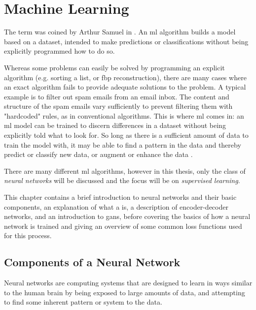 \chapter{Machine Learning}
\label{sec:ml}
The term  was coined by Arthur Samuel in \citeyear{samuelmachinelearning} \cite{samuelmachinelearning}. An \gls{ml} algorithm builds a model based on a dataset, intended to make predictions or classifications without being explicitly programmed how to do so. 

Whereas some problems can easily be solved by programming an explicit algorithm (e.g. sorting a list, or \gls{fbp} reconstruction), there are many cases where an exact algorithm fails to provide adequate solutions to the problem. A typical example is to filter out spam emails from an email inbox. The content and structure of the spam emails vary sufficiently to prevent filtering them with "hardcoded" rules, as in conventional algorithms. This is where \gls{ml} comes in: an \gls{ml} model can be trained to discern differences in a dataset without being explicitly told what to look for. So long as there is a sufficient amount of data to train the model with, it may be able to find a pattern in the data and thereby predict or classify new data, or augment or enhance the data \cite[2-4]{Alpaydin10}. 

There are many different \gls{ml} algorithms, however in this thesis, only the class of \textit{neural networks} will be discussed and the focus will be on \textit{supervised learning}. 

This chapter contains a brief introduction to neural networks and their basic components, an explanation of what a  is, a description of encoder-decoder networks, and an introduction to \glspl{gan}, before covering the basics of how a neural network is trained and giving an overview of some common loss functions used for this process. 

\section{Components of a Neural Network}
\label{sec:ml:componentsofaneuralnetwork}
Neural networks are computing systems that are designed to learn in ways similar to the human brain by being exposed to large amounts of data, and attempting to find some inherent pattern or system to the data. 

